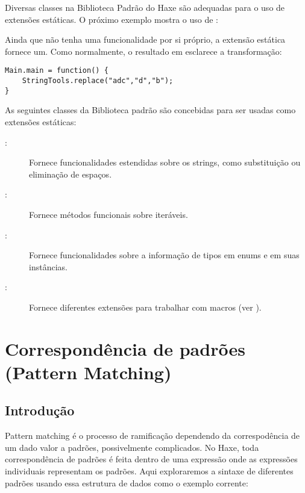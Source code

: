 {Diversas classes na Biblioteca Padrão do Haxe são adequadas para o uso de extensões estáticas. O próximo exemplo mostra o uso de :


Ainda que  não tenha uma funcionalidade  por si próprio, a extensão estática  fornece um. Como normalmente, o resultado em  esclarece a transformação:

\begin{lstlisting}
Main.main = function() {
	StringTools.replace("adc","d","b");
}
\end{lstlisting}

As seguintes classes da Biblioteca padrão são concebidas para ser usadas como extensões estáticas:

\begin{description}
    \item[:] Fornece funcionalidades estendidas sobre os strings, como substituição ou eliminação de espaços.
    \item[:] Fornece métodos funcionais sobre iteráveis.
    \item[:] Fornece funcionalidades sobre a informação de tipos em enums e em suas instâncias.
    \item[:] Fornece diferentes extensões para trabalhar com macros (ver ).
\end{description}
        

\section{Correspondência de padrões (Pattern Matching)}
\label{lf-pattern-matching}

\subsection{Introdução}
\label{lf-pattern-matching-introduction}

Pattern matching é o processo de ramificação dependendo da correspodência de um dado valor a padrões, possivelmente complicados. No Haxe, toda correspondência de padrões é feita dentro de uma expressão  onde as expressões  individuais representam os padrões. Aqui exploraremos a sintaxe de diferentes padrões usando essa estrutura de dados como o exemplo corrente:

}
